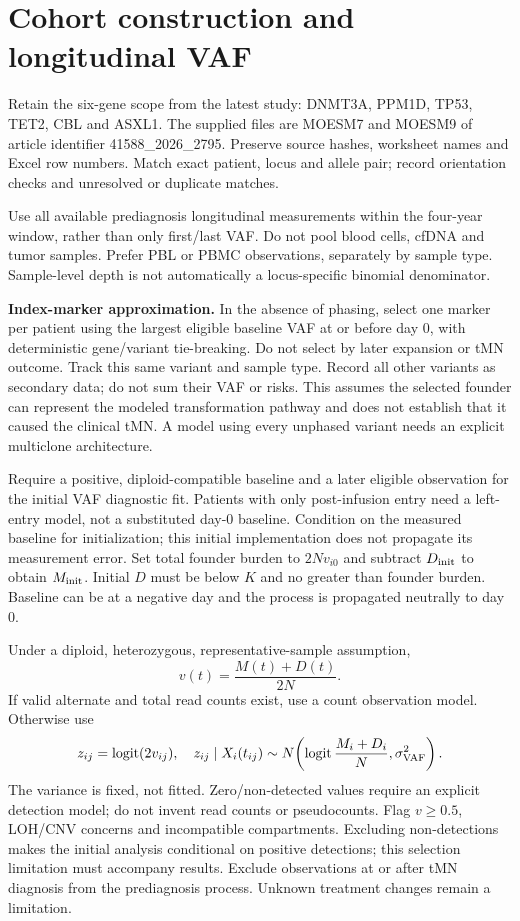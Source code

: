 \documentclass[11pt]{article}
\begin{document}
\section{Cohort construction and longitudinal VAF}
Retain the six-gene scope from the latest study: DNMT3A, PPM1D, TP53, TET2, CBL and ASXL1. The supplied files are MOESM7 and MOESM9 of article identifier 41588\_2026\_2795. Preserve source hashes, worksheet names and Excel row numbers. Match exact patient, locus and allele pair; record orientation checks and unresolved or duplicate matches.

Use all available prediagnosis longitudinal measurements within the four-year window, rather than only first/last VAF. Do not pool blood cells, cfDNA and tumor samples. Prefer PBL or PBMC observations, separately by sample type. Sample-level depth is not automatically a locus-specific binomial denominator.

\textbf{Index-marker approximation.} In the absence of phasing, select one marker per patient using the largest eligible baseline VAF at or before day 0, with deterministic gene/variant tie-breaking. Do not select by later expansion or tMN outcome. Track this same variant and sample type. Record all other variants as secondary data; do not sum their VAF or risks. This assumes the selected founder can represent the modeled transformation pathway and does not establish that it caused the clinical tMN. A model using every unphased variant needs an explicit multiclone architecture.

Require a positive, diploid-compatible baseline and a later eligible observation for the initial VAF diagnostic fit. Patients with only post-infusion entry need a left-entry model, not a substituted day-0 baseline. Condition on the measured baseline for initialization; this initial implementation does not propagate its measurement error. Set total founder burden to $2Nv_{i0}$ and subtract $D_{\rm init}$ to obtain $M_{\rm init}$. Initial $D$ must be below $K$ and no greater than founder burden. Baseline can be at a negative day and the process is propagated neutrally to day 0.

Under a diploid, heterozygous, representative-sample assumption,
\[
v(t)=\frac{M(t)+D(t)}{2N}.
\]
If valid alternate and total read counts exist, use a count observation model. Otherwise use
\[
z_{ij}=\operatorname{logit}(2v_{ij}),\quad
z_{ij}\mid X_i(t_{ij})\sim
N\!\left(\operatorname{logit}\frac{M_i+D_i}{N},\sigma_{\rm VAF}^2\right).
\]
The variance is fixed, not fitted. Zero/non-detected values require an explicit detection model; do not invent read counts or pseudocounts. Flag $v\ge0.5$, LOH/CNV concerns and incompatible compartments. Excluding non-detections makes the initial analysis conditional on positive detections; this selection limitation must accompany results. Exclude observations at or after tMN diagnosis from the prediagnosis process. Unknown treatment changes remain a limitation.
\end{document}

